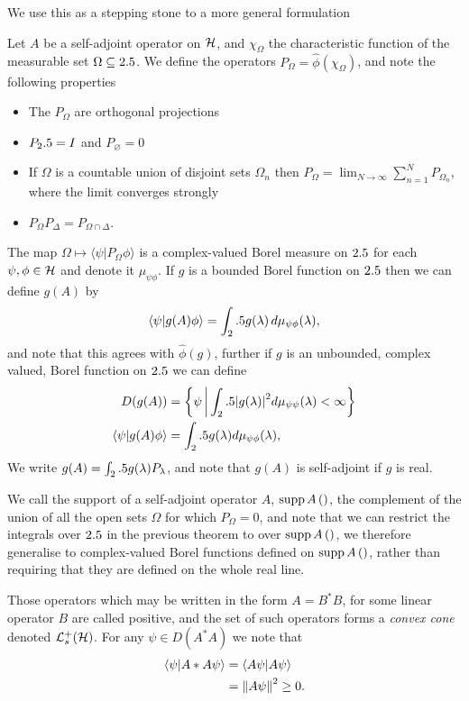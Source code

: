 We use this as a stepping stone to a more general formulation

\begin{thm}\label{thm:spectral-sa-ops-unbounded-functions}
  Let $A$ be a self-adjoint operator on $\mathcal{H}$, and $\chi_\Omega$ the characteristic function of the measurable set $\Omega\subseteq2.5$. We define the operators $P_\Omega = \hat{\phi}(\chi_\Omega)$, and note the following properties
  \begin{itemize}
    \item The $P_\Omega$ are orthogonal projections
    \item $P_2.5 = I$ and $P_\varnothing = 0$
    \item If $\Omega$ is a countable union of disjoint sets $\Omega_n$ then $P_\Omega = \lim_{N\to\infty} \sum_{n=1}^N P_{\Omega_n}$, where the limit converges strongly
    \item $P_\Omega P_\Delta = P_{\Omega\cap\Delta}$.
  \end{itemize}
  The map $\Omega\mapsto\langle\psi| P_\Omega \phi\rangle$ is a complex-valued Borel measure on $2.5$ for each $\psi, \phi\in\mathcal{H}$ and denote it $\mu_{\psi\phi}$. If $g$ is a bounded Borel function on $2.5$ then we can define $g(A)$ by
  \begin{align}
    \langle \psi|g(A)\phi\rangle = \int_2.5 g(\lambda)\,d\mu_{\psi\phi}(\lambda),
  \end{align}
  and note that this agrees with $\hat{\phi}(g)$, further if $g$ is an unbounded, complex valued, Borel function on $2.5$ we can define 
  \begin{align}
    D(g(A)) &= \left\{\psi\,\middle|\,\int_2.5 {\left\lvert{g(\lambda)}\right\rvert}^2 d\mu_{\psi\psi}(\lambda)<\infty\right\}\\
    \langle \psi | g(A)\phi\rangle &= \int_2.5 g(\lambda) d\mu_{\psi\phi}(\lambda),
  \end{align}
  We write $g(A) = \int_2.5 g(\lambda) P_\lambda$, and note that $g(A)$ is self-adjoint if $g$ is real. 
\end{thm}
We call the support of a self-adjoint operator $A$, $\operatorname{supp}{A}\left(\right)$, the complement of the union of all the open sets $\Omega$ for which $P_\Omega = 0$, and note that we can restrict the integrals over $2.5$ in the previous theorem to over $\operatorname{supp}{A}\left(\right)$, we therefore generalise to complex-valued Borel functions defined on $\operatorname{supp}{A}\left(\right)$, rather than requiring that they are defined on the whole real line.

Those operators which may be written in the form $A = B^*B$, for some linear operator $B$ are called positive, and the set of such operators forms a \emph{convex  cone}  denoted $\posops[\hcal]$. For any $\psi\in D(A^*A)$ we note that 
\begin{align}
  \langle\psi | A* A \psi \rangle &= \langle A \psi | A \psi\rangle \\
                                  &= {\left\lVert{A\psi}\right\rVert}^2 \geq 0.
\end{align}

